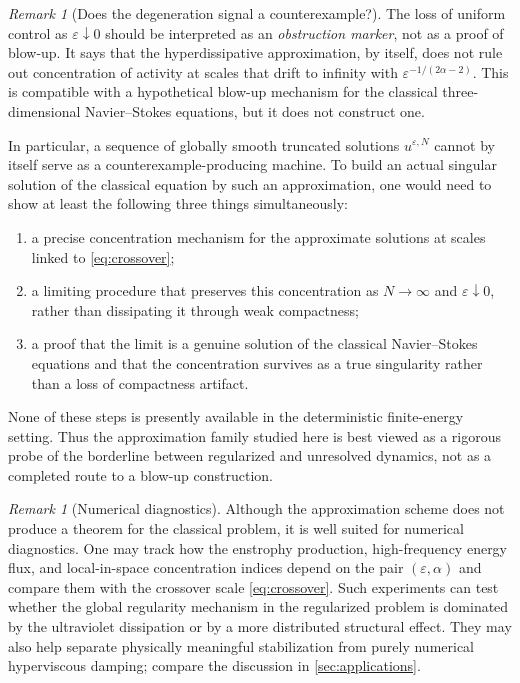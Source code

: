 \documentclass[11pt]{article}
\theoremstyle{definition}
\theoremstyle{remark}
\newtheorem{remark}[theorem]{Remark}
\begin{document}
\begin{remark}[Does the degeneration signal a counterexample?]\label{rem:counterexample}
The loss of uniform control as $\varepsilon\downarrow0$ should be interpreted as an \emph{obstruction marker}, not as a proof of blow-up. It says that the hyperdissipative approximation, by itself, does not rule out concentration of activity at scales that drift to infinity with $\varepsilon^{-1/(2\alpha-2)}$. This is compatible with a hypothetical blow-up mechanism for the classical three-dimensional Navier--Stokes equations, but it does not construct one.

In particular, a sequence of globally smooth truncated solutions $u^{\varepsilon,N}$ cannot by itself serve as a counterexample-producing machine. To build an actual singular solution of the classical equation by such an approximation, one would need to show at least the following three things simultaneously:
\begin{enumerate}[label=(\roman*)]
\item a precise concentration mechanism for the approximate solutions at scales linked to \eqref{eq:crossover};
\item a limiting procedure that preserves this concentration as $N\to\infty$ and $\varepsilon\downarrow0$, rather than dissipating it through weak compactness;
\item a proof that the limit is a genuine solution of the classical Navier--Stokes equations and that the concentration survives as a true singularity rather than a loss of compactness artifact.
\end{enumerate}
None of these steps is presently available in the deterministic finite-energy setting. Thus the approximation family studied here is best viewed as a rigorous probe of the borderline between regularized and unresolved dynamics, not as a completed route to a blow-up construction.
\end{remark}

\begin{remark}[Numerical diagnostics]
Although the approximation scheme does not produce a theorem for the classical problem, it is well suited for numerical diagnostics. One may track how the enstrophy production, high-frequency energy flux, and local-in-space concentration indices depend on the pair $(\varepsilon,\alpha)$ and compare them with the crossover scale \eqref{eq:crossover}. Such experiments can test whether the global regularity mechanism in the regularized problem is dominated by the ultraviolet dissipation or by a more distributed structural effect. They may also help separate physically meaningful stabilization from purely numerical hyperviscous damping; compare the discussion in \cref{sec:applications}.
\end{remark}
\end{document}
